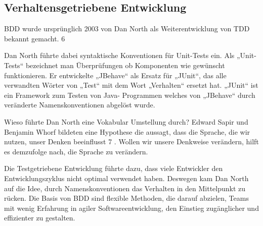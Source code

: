 \subsection{Verhaltensgetriebene Entwicklung}
BDD wurde ursprünglich 2003 von Dan North als Weiterentwicklung von TDD bekannt gemacht. 6

Dan North führte dabei syntaktische Konventionen für Unit-Tests ein. Als „Unit-Tests“ bezeichnet man Überprüfungen ob Komponenten wie gewünscht funktionieren. Er
entwickelte „JBehave“ als Ersatz für „JUnit“, das alle verwandten Wörter von „Test“ mit dem Wort „Verhalten“ ersetzt hat. „JUnit“ ist ein Framework zum Testen von Java-
Programmen welches von „JBehave“ durch veränderte Namenskonventionen abgelöst wurde.

Wieso führte Dan North eine Vokabular Umstellung durch? Edward Sapir und Benjamin Whorf bildeten eine Hypothese die aussagt, dass die Sprache, die wir nutzen, unser 
Denken beeinflusst 7 . Wollen wir unsere Denkweise verändern, hilft es demzufolge nach, die Sprache zu verändern.

Die Testgetriebene Entwicklung führte dazu, dass viele Entwickler den Entwicklungszyklus nicht optimal verwendet haben. Deswegen kam Dan North auf die Idee, durch
Namenskonventionen das Verhalten in den Mittelpunkt zu rücken. Die Basis von BDD sind flexible Methoden, die darauf abzielen, Teams mit wenig Erfahrung in agiler 
Softwareentwicklung, den Einstieg zugänglicher und effizienter zu gestalten.


